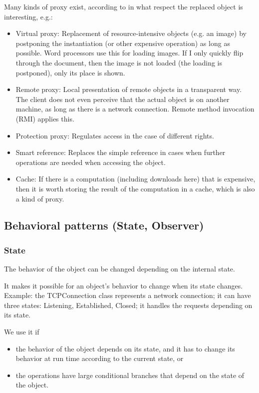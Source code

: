 \documentclass[margin=0px]{article}
\begin{document}
Many kinds of proxy exist, according to in what respect the replaced object is interesting, e.g.:
\begin{itemize}
    \item Virtual proxy: Replacement of resource-intensive objects (e.g. an image) by postponing the instantiation (or other expensive operation) as long as possible. Word processors use this for loading images. If I only quickly flip through the document, then the image is not loaded (the loading is postponed), only its place is shown.
    \item Remote proxy: Local presentation of remote objects in a transparent way. The client does not even perceive that the actual object is on another machine, as long as there is a network connection. Remote method invocation (RMI) applies this.
    \item Protection proxy: Regulates access in the case of different rights.
    \item Smart reference: Replaces the simple reference in cases when further operations are needed when accessing the object.
    \item Cache: If there is a computation (including downloads here) that is expensive, then it is worth storing the result of the computation in a cache, which is also a kind of proxy.
\end{itemize}

\subsection{Behavioral patterns (State, Observer)}

\subsubsection{State}
The behavior of the object can be changed depending on the internal state.

It makes it possible for an object's behavior to change when its state changes. Example: the TCPConnection class represents a network connection; it can have three states: Listening, Established, Closed; it handles the requests depending on its state.

We use it if
\begin{itemize}
    \item the behavior of the object depends on its state, and it has to change its behavior at run time according to the current state, or
    \item the operations have large conditional branches that depend on the state of the object.
\end{itemize}
\end{document}
